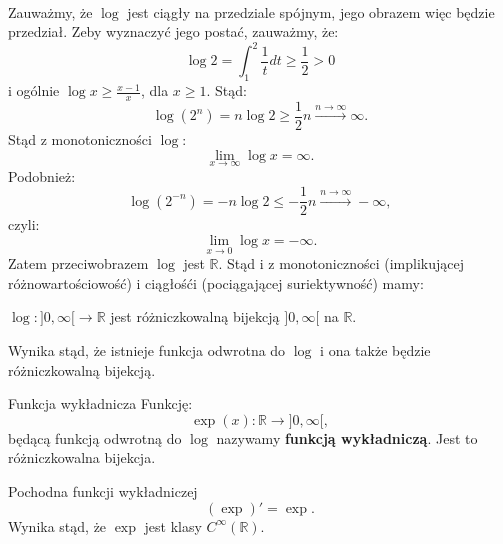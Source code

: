 \documentclass{article}
\numberwithin{defi}{section}
\numberwithin{defi}{section}
\newcommand{\R}{\mathbb{R}}
\newcommand{\oo}{\infty}
\providecommand{\half}{\frac{1}{2}}
\renewcommand{\geq}{\geqslant}
\renewcommand{\leq}{\leqslant}
\newcommand{\tb}[1]{\textbf{#1}}
\begin{document}
\paragraph{} Zauważmy, że $\log$ jest ciągły na przedziale spójnym, jego obrazem więc będzie przedział. Zeby wyznaczyć jego postać, zauważmy, że: \begin{equation}
    \log 2 = \int_{1}^{2} \frac{1}{t} dt \geq \frac{1}{2} > 0
\end{equation} i ogólnie $\log x \geq \frac{x - 1}{x}$, dla $x \geq 1$. Stąd: \begin{equation}
    \log (2 ^ n) = n \log 2 \geq \half n \xrightarrow[]{n \to \oo} \oo.
\end{equation} Stąd z monotoniczności $\log$: \begin{equation}
    \lim_{x \to \oo} \log x = \oo.
\end{equation} Podobnież: \begin{equation}
    \log (2 ^ {-n}) = -n \log 2 \leq -\half n \xrightarrow[]{n \to \oo} -\oo,
\end{equation} czyli: \begin{equation}
    \lim_{x \to 0} \log x = -\oo.
\end{equation}
Zatem przeciwobrazem $\log$ jest $\R$. Stąd i z monotoniczności (implikującej różnowartościowość) i ciągłośći (pociągającej suriektywność) mamy:

\begin{obs}{}
    $\log: ]0, \oo[ \to \R$ jest różniczkowalną bijekcją $]0, \oo[$ na $\R$.
\end{obs}


Wynika stąd, że istnieje funkcja odwrotna do $\log$ i ona także będzie różniczkowalną bijekcją.

\begin{defr}{Funkcja wykładnicza}
    Funkcję: \begin{equation}
        \exp(x): \R \to ]0, \oo[,
    \end{equation} będącą funkcją odwrotną do $\log$ nazywamy \tb{funkcją wykładniczą}. Jest to różniczkowalna bijekcja.
\end{defr}

\begin{twier}{Pochodna funkcji wykładniczej}
    \begin{equation}
        (\exp)' = \exp.
    \end{equation}
    Wynika stąd, że $\exp$ jest klasy $C^\oo (\R)$.
\end{twier}
\end{document}

